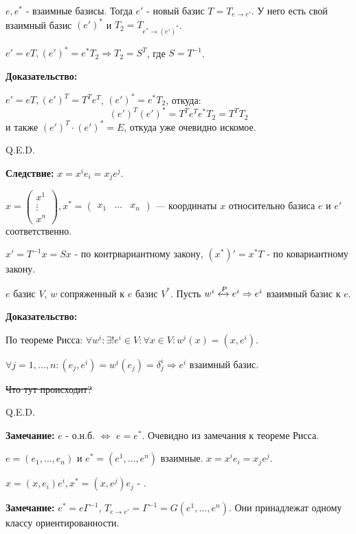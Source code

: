 
$e, e^*$ - взаимные базисы. Тогда $e'$ - новый базис $T = T_{e\rightarrow e'}$.  У него есть свой взаимный базис  $(e')^*$ и $T_2 =T_{e^*\rightarrow (e')^*}$.

$e' = eT, (e')^* = e^* T_2 \Rightarrow T_2 = S^T$, где $S = T^{-1}$.


\textbf{Доказательство:}

$e' = eT, (e')^T = T^Te^T$, $(e')^* = e^* T_2$, откуда:
$$(e')^T (e')^* =   T^T e^T e^* T_2 =T^T T_2$$
и также $(e')^T \cdot (e')^* = E$, откуда уже очевидно искомое.

\hfill Q.E.D.


\textbf{Следствие:} $x = x^i e_i = x_je^j$.

$x = \begin{pmatrix}
    x^1 \\
    \vdots \\
    x^n
\end{pmatrix}, x^* = \begin{pmatrix}
    x_1 & \ldots & x_n
\end{pmatrix}$ --- координаты $x$ относительно базиса $e$ и $e'$ соответственно.

$x' = T^{-1} x =Sx$ - по контрвариантному закону, $(x^*)' = x^*T$ - по ковариантному закону.


$e$ базис $V$, $w$ сопряженный к $e$ базис $V^*$. Пусть $w^i \xleftrightarrow{P}e^i \Rightarrow e^i$ взаимный базис к $e$. 

\textbf{ Доказательство:}

По теореме Рисса: $\forall w^i:\exists! e^i \in V: \forall x \in V: w^i(x) =(x,e^i)$.

$\forall j = 1,\ldots, n: (e_j,e^i) = w^i(e_j) = \delta_j^i \Rightarrow e^i$ взаимный базис.

\sout{Что тут происходит?}

\hfill Q.E.D.

\textbf{Замечание:} $e$ - о.н.б. $\Leftrightarrow$ $e = e^*$. Очевидно из замечания к теореме Рисса.

$e =(e_1,\ldots, e_n)$ и $e^* =(e^1,\ldots, e^n)$ взаимные. $x = x^ie_i =x_je^j$.

$x = (x,e_i)e^i, x^* = (x,e^j)e_j$ - .

\textbf{Замечание:} $e^* = e \Gamma^{-1}$, $T_{e\rightarrow e'} =\Gamma^{-1}  = G(e^1,\ldots, e^n)$. Они принадлежат одному классу ориентированности.

